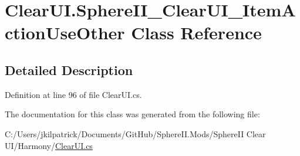\hypertarget{class_clear_u_i_1_1_sphere_i_i___clear_u_i___item_action_use_other}{}\section{Clear\+U\+I.\+Sphere\+I\+I\+\_\+\+Clear\+U\+I\+\_\+\+Item\+Action\+Use\+Other Class Reference}
\label{class_clear_u_i_1_1_sphere_i_i___clear_u_i___item_action_use_other}


\subsection{Detailed Description}


Definition at line 96 of file Clear\+U\+I.\+cs.



The documentation for this class was generated from the following file\+:\begin{DoxyCompactItemize}
\item 
C\+:/\+Users/jkilpatrick/\+Documents/\+Git\+Hub/\+Sphere\+I\+I.\+Mods/\+Sphere\+I\+I Clear U\+I/\+Harmony/\mbox{\hyperlink{_clear_u_i_8cs}{Clear\+U\+I.\+cs}}\end{DoxyCompactItemize}
